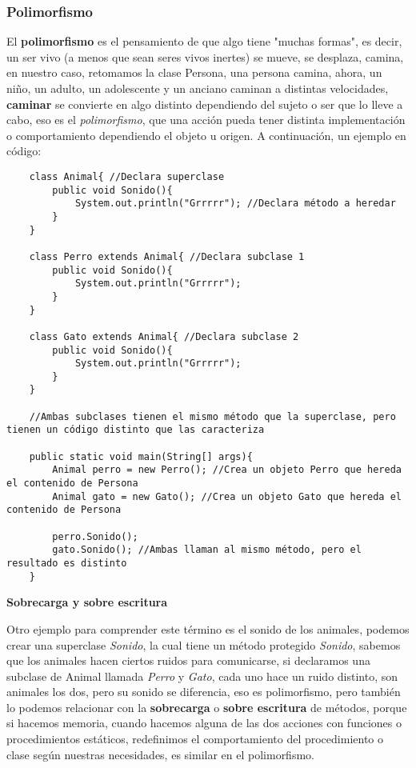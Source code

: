 \subsubsection{Polimorfismo}
\hspace{0.55cm}El \textbf{polimorfismo} es el pensamiento de que algo tiene "muchas formas", es decir, un ser vivo (a menos que sean seres vivos inertes) se mueve, se desplaza, camina, en nuestro caso, retomamos la clase Persona, una persona camina, ahora, un niño, un adulto, un adolescente y un anciano caminan a distintas velocidades, \textbf{caminar} se convierte en algo distinto dependiendo del sujeto o ser que lo lleve a cabo, eso es el \textit{polimorfismo}, que una acción pueda tener distinta implementación o comportamiento dependiendo el objeto u origen.
A continuación, un ejemplo en código:
\begin{lstlisting}
    class Animal{ //Declara superclase
        public void Sonido(){
            System.out.println("Grrrrr"); //Declara método a heredar
        }
    }
    
    class Perro extends Animal{ //Declara subclase 1
        public void Sonido(){
            System.out.println("Grrrrr");
        }
    }
    
    class Gato extends Animal{ //Declara subclase 2
        public void Sonido(){
            System.out.println("Grrrrr");
        }
    }
    
    //Ambas subclases tienen el mismo método que la superclase, pero tienen un código distinto que las caracteriza
    
    public static void main(String[] args){
        Animal perro = new Perro(); //Crea un objeto Perro que hereda el contenido de Persona
        Animal gato = new Gato(); //Crea un objeto Gato que hereda el contenido de Persona
        
        perro.Sonido();
        gato.Sonido(); //Ambas llaman al mismo método, pero el resultado es distinto
    }
\end{lstlisting}

\textbf{Sobrecarga y sobre escritura}

Otro ejemplo para comprender este término es el sonido de los animales, podemos crear una superclase \textit{Sonido}, la cual tiene un método protegido \textit{Sonido}, sabemos que los animales hacen ciertos ruidos para comunicarse, si declaramos una subclase de Animal llamada \textit{Perro} y \textit{Gato}, cada uno hace un ruido distinto, son animales los dos, pero su sonido se diferencia, eso es polimorfismo, pero también lo podemos relacionar con la \textbf{sobrecarga} o \textbf{sobre escritura} de métodos, porque si hacemos memoria, cuando hacemos alguna de las dos acciones con funciones o procedimientos estáticos, redefinimos el comportamiento del procedimiento o clase según nuestras necesidades, es similar en el polimorfismo.

